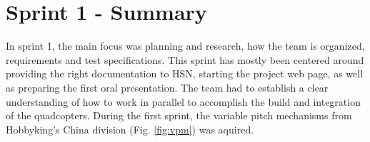 \chapter{Sprint 1 - Summary}

In sprint 1, the main focus was planning and research, how the team is organized, requirements and test specifications. This sprint has mostly been centered around providing the right documentation to HSN, starting the project web page, as well as preparing the first oral presentation. The team had to establish a clear understanding of how to work in parallel to accomplish the build and integration of the quadcopters. 
\newline \newline
During the first sprint, the variable pitch mechanisms from Hobbyking's China division (Fig. \ref{fig:vpm}) was aquired. 

